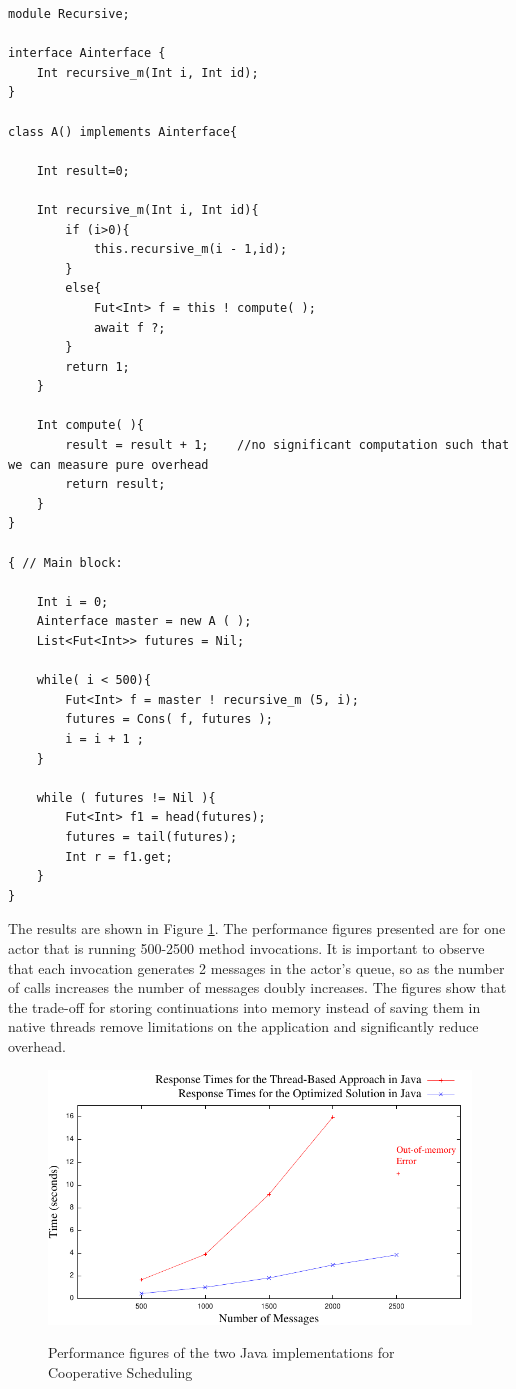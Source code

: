 \begin{lstlisting}[caption= ABS Example, label=absex]
module Recursive;

interface Ainterface {
	Int recursive_m(Int i, Int id);
}

class A() implements Ainterface{

	Int result=0;
	
	Int recursive_m(Int i, Int id){
		if (i>0){
			this.recursive_m(i - 1,id);	
		}
		else{
			Fut<Int> f = this ! compute( );
			await f ?;
		}
		return 1;
	}
	
	Int compute( ){
		result = result + 1;	//no significant computation such that we can measure pure overhead
		return result;
	}
}

{ // Main block:

	Int i = 0;	
	Ainterface master = new A ( );
	List<Fut<Int>> futures = Nil;
	
	while( i < 500){		
		Fut<Int> f = master ! recursive_m (5, i);
		futures = Cons( f, futures );
		i = i + 1 ;
	}
	
	while ( futures != Nil ){
		Fut<Int> f1 = head(futures);
		futures = tail(futures);
		Int r = f1.get;
	}
}
\end{lstlisting}

\par The results are shown in Figure \ref{jj}.  The performance figures presented are for one actor that is running 500-2500 method invocations. It is important to observe that each invocation generates 2 messages in the actor's queue, so as the number of calls increases the number of messages doubly increases. The figures show that the trade-off for storing continuations into memory instead of saving them in native threads remove limitations on the application and significantly reduce overhead.


\begin{figure}
	\caption{Performance figures of the two Java implementations for Cooperative Scheduling}
	\centering
	\includegraphics[scale=0.8]{jaj8.pdf}
	\label{jj}
\end{figure}

